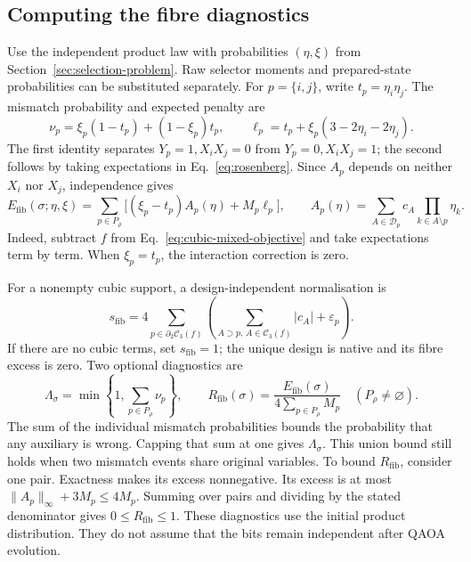 \documentclass[a4paper,onecolumn,11pt,unpublished]{quantumarticle}
\theoremstyle{remark}
\begin{document}
\subsection{Computing the fibre diagnostics}
\label{app:fibre-risk}

Use the independent product law with probabilities $(\eta,\xi)$ from
Section~\ref{sec:selection-problem}. Raw selector moments and prepared-state
probabilities can be substituted separately.
For $p=\{i,j\}$, write $t_p=\eta_i\eta_j$.  The mismatch probability and
expected penalty are
\begin{equation}
\nu_p=\xi_p(1-t_p)+(1-\xi_p)t_p,
\qquad
\ell_p=t_p+\xi_p(3-2\eta_i-2\eta_j).
\label{eq:fibre-violation-probability}
\end{equation}
The first identity separates $Y_p=1,X_iX_j=0$ from $Y_p=0,X_iX_j=1$;
the second follows by taking expectations in Eq.~\eqref{eq:rosenberg}.
Since $A_p$ depends on neither $X_i$ nor $X_j$, independence gives
\begin{equation}
E_{\mathrm{fib}}(\sigma;\eta,\xi)
=\sum_{p\in P_\rho}\bigl[(\xi_p-t_p)A_p(\eta)+M_p\ell_p\bigr],
\qquad
A_p(\eta)=\sum_{A\in\mathcal D_p}c_A\prod_{k\in A\setminus p}\eta_k.
\label{eq:fibre-excess-full}
\end{equation}
Indeed, subtract $f$ from Eq.~\eqref{eq:cubic-mixed-objective} and take
expectations term by term.  When $\xi_p=t_p$, the interaction correction is zero.

For a nonempty cubic support, a design-independent normalisation is
\[
s_{\mathrm{fib}}=4\sum_{p\in\partial_2\mathcal C_3(f)}
\left(\sum_{A\supset p,\,A\in\mathcal C_3(f)}|c_A|+\varepsilon_p\right).
\]
If there are no cubic terms, set $s_{\mathrm{fib}}=1$; the unique design is
native and its fibre excess is zero.  Two optional diagnostics are
\[
\Lambda_\sigma=\min\left\{1,\sum_{p\in P_\rho}\nu_p\right\},
\qquad
R_{\mathrm{fib}}(\sigma)=\frac{E_{\mathrm{fib}}(\sigma)}
{4\sum_{p\in P_\rho}M_p}\quad(P_\rho\neq\varnothing).
\]
The sum of the individual mismatch probabilities bounds the probability
that any auxiliary is wrong. Capping that sum at one gives
$\Lambda_\sigma$. This union bound still holds when two mismatch events
share original variables. To bound $R_{\mathrm{fib}}$, consider one pair.
Exactness makes its excess nonnegative. Its excess is at most
$\|A_p\|_\infty+3M_p\leq4M_p$.
Summing over pairs and dividing by the stated denominator gives
$0\leq R_{\mathrm{fib}}\leq1$.
These diagnostics use the initial product distribution. They do not assume
that the bits remain independent after QAOA evolution.
\end{document}
